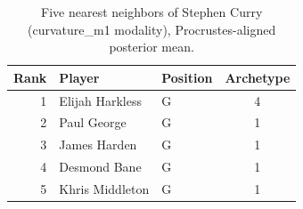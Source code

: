 \begin{table}[htbp]
  \centering\small
  \begin{tabular}{rllc}
    \toprule
    Rank & Player & Position & Archetype \\
    \midrule
    1 & Elijah Harkless & G & 4 \\
    2 & Paul George & G & 1 \\
    3 & James Harden & G & 1 \\
    4 & Desmond Bane & G & 1 \\
    5 & Khris Middleton & G & 1 \\
    \bottomrule
  \end{tabular}
  \caption{Five nearest neighbors of Stephen Curry (curvature_m1 modality), Procrustes-aligned posterior mean.}
  \label{tab:Stephen_Curry_neighbors_curvature_m1}
\end{table}

